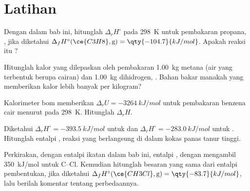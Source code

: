 \section{Latihan}

\begin{exercise}[$\star$]\label{exo:b2:reaction-enthalpy:1}
Dengan  dalam bab ini, hitunglah
$\Delta_r H^\circ$ pada \qty{298}{K} untuk pembakaran propana,
, jika diketahui $\Delta_f
H^\circ(\ce{C3H8}, \text{g}) = \qty{-104.7}{kJ/mol}$. Apakah reaksi itu
?
\end{exercise}

\begin{exercise}[$\star$]\label{exo:b2:reaction-enthalpy:2}
Hitunglah kalor yang dilepaskan oleh pembakaran \qty{1.00}{kg} metana (air
yang terbentuk berupa cairan) dan \qty{1.00}{kg} dihidrogen,
. Bahan bakar manakah yang memberikan kalor
lebih banyak per kilogram?
\end{exercise}

\begin{exercise}[$\star$]\label{exo:b2:reaction-enthalpy:3}
Kalorimeter bom memberikan $\Delta_r U = \qty{-3264}{kJ/mol}$ untuk
pembakaran benzena cair menurut 
pada \qty{298}{K}. Hitunglah $\Delta_r H$.
\end{exercise}

\begin{exercise}[$\star$]\label{exo:b2:reaction-enthalpy:4}
Diketahui $\Delta_r H^\circ = \qty{-393.5}{kJ/mol}$ untuk
 dan $\Delta_r H^\circ = \qty{-283.0}{kJ/mol}$
untuk . Hitunglah entalpi
, reaksi yang berlangsung di dalam kokas panas
tanur tinggi.
\end{exercise}

\begin{exercise}[$\star\star$]\label{exo:b2:reaction-enthalpy:5}
Perkirakan, dengan entalpi ikatan dalam bab ini, entalpi
, dengan mengambil
\qty{350}{kJ/mol} untuk C--Cl. Kemudian hitunglah besaran yang sama dari
entalpi pembentukan, jika diketahui
$\Delta_f H^\circ(\ce{CH3Cl}, \text{g}) = \qty{-83.7}{kJ/mol}$, lalu berilah
komentar tentang perbedaannya.
\end{exercise}

